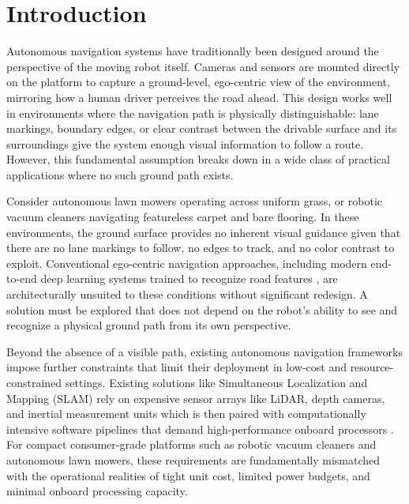 \chapter{Introduction}

Autonomous navigation systems have traditionally been designed around the perspective of the moving robot itself. Cameras and sensors are mounted directly on the platform to capture a ground-level, ego-centric view of the environment, mirroring how a human driver perceives the road ahead. This design works well in environments where the navigation path is physically distinguishable: lane markings, boundary edges, or clear contrast between the drivable surface and its surroundings give the system enough visual information to follow a route. However, this fundamental assumption breaks down in a wide class of practical applications where no such ground path exists.

Consider autonomous lawn mowers operating across uniform grass, or robotic vacuum cleaners navigating featureless carpet and bare flooring. In these environments, the ground surface provides no inherent visual guidance given that there are no lane markings to follow, no edges to track, and no color contrast to exploit. Conventional ego-centric navigation approaches, including modern end-to-end deep learning systems trained to recognize road features \citep{Bojarski2016PilotNet}, are architecturally unsuited to these conditions without significant redesign. A solution must be explored that does not depend on the robot's ability to see and recognize a physical ground path from its own perspective.

Beyond the absence of a visible path, existing autonomous navigation frameworks impose further constraints that limit their deployment in low-cost and resource-constrained settings. Existing solutions like Simultaneous Localization and Mapping (SLAM) rely on expensive sensor arrays like LiDAR, depth cameras, and inertial measurement units which is then paired with computationally intensive software pipelines that demand high-performance onboard processors \citep{Bian2023FiMa}. For compact consumer-grade platforms such as robotic vacuum cleaners and autonomous lawn mowers, these requirements are fundamentally mismatched with the operational realities of tight unit cost, limited power budgets, and minimal onboard processing capacity.

